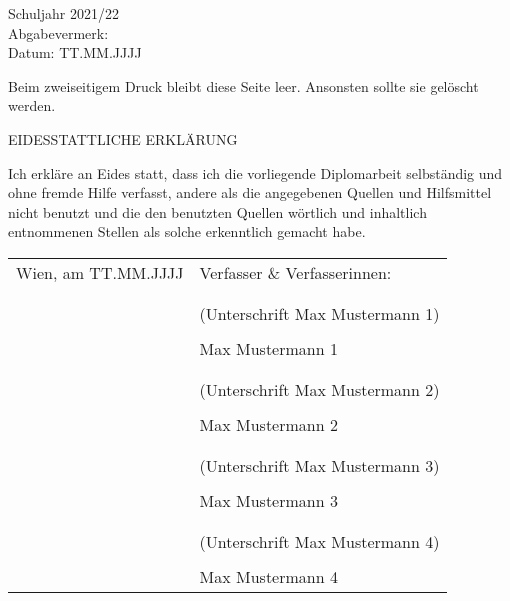 \documentclass[letterpaper,10pt]{article}
\begin{document}
Schuljahr 2021/22 \\

Abgabevermerk: \\

Datum: TT.MM.JJJJ


\raggedright

\pagebreak

Beim zweiseitigem Druck bleibt diese Seite leer. Ansonsten sollte sie gelöscht werden.

\pagebreak


\begin{center}
    \Huge{EIDESSTATTLICHE ERKLÄRUNG}

\end{center}

Ich erkläre an Eides statt, dass ich die vorliegende Diplomarbeit selbständig und ohne fremde Hilfe verfasst, andere als die angegebenen Quellen und Hilfsmittel nicht benutzt und die den benutzten Quellen wörtlich und inhaltlich entnommenen Stellen als solche erkenntlich gemacht habe.

\begin{tabular*}{\textwidth}{l l}
    Wien, am TT.MM.JJJJ & Verfasser \& Verfasserinnen: \\
    \\
    \\
    & (Unterschrift Max Mustermann 1) \\
    \\
    & Max Mustermann 1 \\
    \\
    \\
    & (Unterschrift Max Mustermann 2) \\
    \\
    & Max Mustermann 2 \\
    \\
    \\
    & (Unterschrift Max Mustermann 3) \\
    \\
    & Max Mustermann 3 \\
    \\
    \\
    & (Unterschrift Max Mustermann 4) \\
    \\
    & Max Mustermann 4 \\

\end{tabular*}
\end{document}
